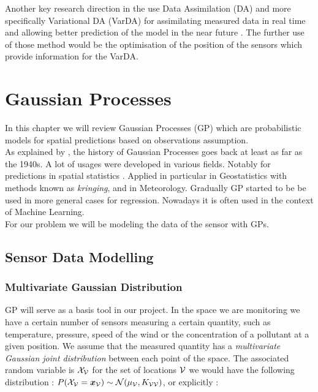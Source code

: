 \documentclass[12pt,twoside]{report}
\begin{document}
Another key research direction in the use Data Assimilation (DA) and more specifically Variational DA (VarDA) for assimilating measured data in real time and allowing better prediction of the model in the near future \citep{arcucci_effective_2018}. The further use of those method would be the optimisation of the position of the sensors which provide information for the VarDA.


\section{Gaussian Processes}

In this chapter we will review Gaussian Processes (GP) which are probabilistic models for spatial predictions based on observations assumption. \\ 

As explained by \citet[p.~29]{rasmussen_gaussian_2006}, the history of Gaussian Processes goes back at least as far as the 1940s. A lot of usages were developed in various fields. Notably for predictions in spatial statistics \citep{cressie_statistics_1991}.  Applied in particular in Geostatistics with methods known as \textit{kringing}, and in Meteorology. Gradually GP started to be be used in more general cases for regression. Nowadays it is often used in the context of Machine Learning. \\


For our problem we will be modeling the data of the sensor with GPs.

\subsection{Sensor Data Modelling}

\subsubsection{Multivariate Gaussian Distribution}

GP will serve as a basis tool in our project. In the space we are monitoring we have a certain number of sensors measuring a certain quantity, such as temperature, pressure, speed of the wind or the concentration of a pollutant at a given position. We assume that the measured quantity  has a \textit{multivariate Gaussian joint distribution} between each point of the space. The associated random variable is $\mathcal{X}_{\mathcal{V}}$ for the set of locations $\mathcal{V}$ we would have the following distribution : $P(\mathcal{X}_{\mathcal{V}} = {\boldsymbol{{x}}}_{\mathcal{V}}) \sim \mathcal{N}(\mu_{\mathcal{V}}, K_{\mathcal{V}\mathcal{V}}) $, or explicitly : 
\end{document}
